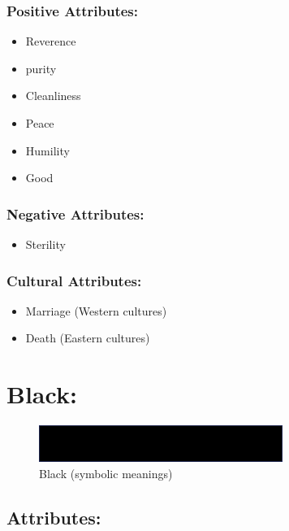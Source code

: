 \documentclass[openleft,oneside,showtrims]{memoir}
\begin{document}
\subsubsection*{Positive Attributes:}
\label{sec:org6e5986a}

\begin{itemize}
\item Reverence
\item purity
\item Cleanliness
\item Peace
\item Humility
\item Good
\end{itemize}

\subsubsection*{Negative Attributes:}
\label{sec:org39e625d}

\begin{itemize}
\item Sterility
\end{itemize}

\subsubsection*{Cultural Attributes:}
\label{sec:org3f501e7}

\begin{itemize}
\item Marriage (Western cultures)
\item Death (Eastern cultures)
\end{itemize}

\section{Black:}
\label{sec:orgd331a6a}

\begin{figure}[htbp]
\centering
\includegraphics[width=300px]{./media/black-banner.png}
\caption{\label{fig:HAP-WR-015}Black (symbolic meanings)}
\end{figure}

\subsection{Attributes:}
\label{sec:org8fccc34}
\end{document}
